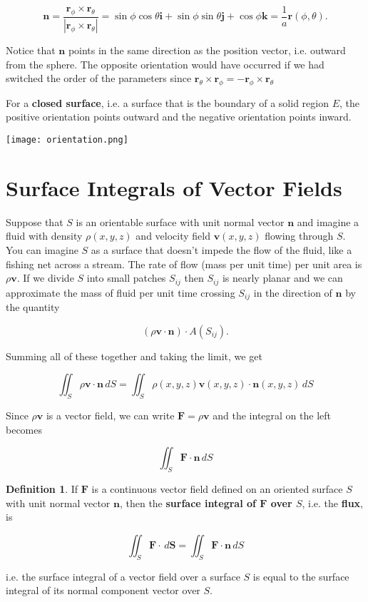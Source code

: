 \documentclass[11pt,oneside,english]{amsart}
\theoremstyle{definition}
\newtheorem*{definition}{Definition}
\begin{document}
\[
\mathbf{n}=\frac{\mathbf{r}_\phi\times\mathbf{r}_\theta}{|\mathbf{r}_\phi\times\mathbf{r}_\theta|}=\sin\phi\cos\theta\mathbf{i}+\sin\phi\sin\theta\mathbf{j}+\cos\phi\mathbf{k}=\frac{1}{a}\mathbf{r}(\phi,\theta).
\]

Notice that $\mathbf{n}$ points in the same direction as the position vector, i.e. outward from the sphere. The opposite orientation would have occurred if we had switched the order of the parameters since $\mathbf{r}_\theta\times\mathbf{r}_\phi=-\mathbf{r}_\phi\times\mathbf{r}_\theta$

For a \textbf{closed surface}, i.e. a surface that is the boundary of a solid region $E$, the positive orientation points outward and the negative orientation points inward.
\begin{center}
\texttt{[image: orientation.png]}
\end{center}


\section*{Surface Integrals of Vector Fields}


Suppose that $S$ is an orientable surface with unit normal vector $\mathbf{n}$ and imagine a fluid with density $\rho(x,y,z)$ and velocity field $\mathbf{v}(x,y,z)$ flowing through $S$. You can imagine $S$ as a surface that doesn't impede the flow of the fluid, like a fishing net across a stream. The rate of flow (mass per unit time) per unit area is $\rho\mathbf{v}$. If we divide $S$ into small patches $S_{ij}$ then $S_{ij}$ is nearly planar and we can approximate the mass of fluid per unit time crossing $S_{ij}$ in the direction of $\mathbf{n}$ by the quantity

\[
(\rho\mathbf{v}\cdot\mathbf{n})\cdot A(S_{ij}).
\]

Summing all of these together and taking the limit, we get

\[
\iint_S\rho\mathbf{v}\cdot\mathbf{n}\,dS=\iint_S\rho(x,y,z)\mathbf{v}(x,y,z)\cdot\mathbf{n}(x,y,z)\,dS
\]


Since $\rho\mathbf{v}$ is a vector field, we can write $\mathbf{F}=\rho\mathbf{v}$ and the integral on the left becomes

\[
\iint_S\mathbf{F\cdot n}\,dS
\]

\begin{definition}
If $\mathbf{F}$ is a continuous vector field defined on an oriented surface $S$ with unit normal vector $\mathbf{n}$, then the \textbf{surface integral of $\mathbf{F}$ over $S$}, i.e. the \textbf{flux},  is 

\[
\iint_S\mathbf{F}\cdot\,d\mathbf{S}=\iint_S\mathbf{F}\cdot\mathbf{n}\,dS
\]

i.e. the surface integral of a vector field over a surface $S$ is equal to the surface integral of its normal component vector over $S$.
\end{definition}
\end{document}
